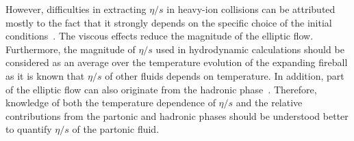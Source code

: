 However, difficulties in extracting $\eta/s$ in heavy-ion collisions can be attributed mostly to the fact that it strongly depends on the specific choice of the initial conditions~\cite{Romatschke:2007mq,Luzum:2012wu,Shen:2011zc}.
The viscous effects reduce the magnitude of the elliptic flow. Furthermore, the magnitude of $\eta/s$ used in hydrodynamic calculations should be considered as an average over the temperature evolution of the expanding fireball as it is known that $\eta/s$ of other fluids depends on temperature. 
In addition, part of the elliptic flow can also originate from the hadronic phase~\cite{Bozek:2011ua,Rose:2014fba,Ryu:2015vwa}. Therefore,
knowledge of both the temperature dependence of $\eta/s$ and the relative contributions from the partonic and hadronic phases should be understood better to quantify $\eta/s$ of the partonic fluid.


